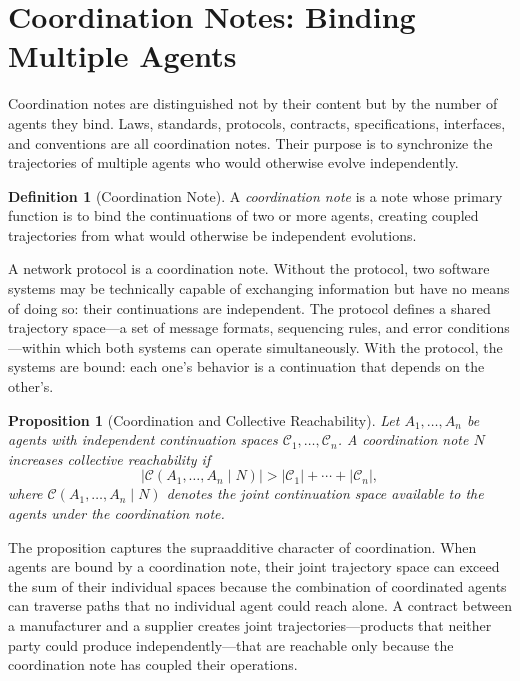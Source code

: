 \documentclass[12pt, a4paper]{article}
\theoremstyle{plain}
\newtheorem{proposition}[theorem]{Proposition}
\theoremstyle{definition}
\newtheorem{definition}[theorem]{Definition}
\theoremstyle{remark}
\begin{document}
\section{Coordination Notes: Binding Multiple Agents}

Coordination notes are distinguished not by their content but by the number of
agents they bind. Laws, standards, protocols, contracts, specifications,
interfaces, and conventions are all coordination notes. Their purpose is to
synchronize the trajectories of multiple agents who would otherwise evolve
independently.

\begin{definition}[Coordination Note]
A \emph{coordination note} is a note whose primary function is to bind the
continuations of two or more agents, creating coupled trajectories from what
would otherwise be independent evolutions.
\end{definition}

A network protocol is a coordination note. Without the protocol, two software
systems may be technically capable of exchanging information but have no means
of doing so: their continuations are independent. The protocol defines a shared
trajectory space---a set of message formats, sequencing rules, and error
conditions---within which both systems can operate simultaneously. With the
protocol, the systems are bound: each one's behavior is a continuation that
depends on the other's.

\begin{proposition}[Coordination and Collective Reachability]
Let $A_1, \ldots, A_n$ be agents with independent continuation spaces
$\mathcal{C}_1, \ldots, \mathcal{C}_n$. A coordination note $N$ increases
collective reachability if
\[
\bigl|\mathcal{C}(A_1, \ldots, A_n \mid N)\bigr|
>
\bigl|\mathcal{C}_1\bigr| + \cdots + \bigl|\mathcal{C}_n\bigr|,
\]
where $\mathcal{C}(A_1, \ldots, A_n \mid N)$ denotes the joint continuation
space available to the agents under the coordination note.
\end{proposition}

The proposition captures the supraadditive character of coordination. When agents
are bound by a coordination note, their joint trajectory space can exceed the sum
of their individual spaces because the combination of coordinated agents can
traverse paths that no individual agent could reach alone. A contract between a
manufacturer and a supplier creates joint trajectories---products that neither
party could produce independently---that are reachable only because the
coordination note has coupled their operations.
\end{document}
